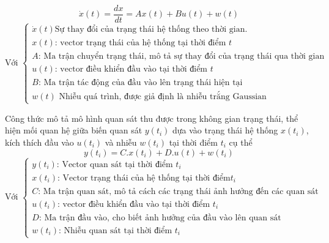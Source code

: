 \documentclass{article}
\begin{document}
    $$\dot{x}(t) = \frac{dx}{dt} = Ax(t) + Bu(t) + w(t)$$
    $$\text{Với }\begin{cases}
        \dot{x}(t) \text{Sự thay đổi của trạng thái hệ thống theo thời gian.}&\\
        x(t) \text{: vector trạng thái của hệ thống tại thời điểm }t&\\
        A \text{: Ma trận chuyển trạng thái, mô tả sự thay đổi của trạng thái qua thời gian}&\\
        u(t) \text{: vector điều khiển đầu vào tại thời điểm }t&\\
        B \text{: Ma trận tác động của đầu vào lên trạng thái hiện tại}&\\
        w(t) \text{ Nhiễu quá trình, được giả định là nhiễu trắng Gaussian}
    \end{cases}$$
    
Công thức mô tả mô hình quan sát thu được trong không gian trạng thái, thể hiện mối quan hệ giữa biến quan sát $y(t_i)$ dựa vào trạng thái hệ thống $x(t_i)$, kích thích đầu vào $u(t_i)$ và nhiễu $w(t_i)$ tại thời điểm $t_i$ cụ thể
$$y(t_i) = C.x(t_i) + D.u(t) + w(t_i)$$
$$\text{Với } \begin{cases}
    y(t_i) \text{: Vector quan sát tại thời điểm }t_i&\\
    x(t_i) \text{: Vector trạng thái của hệ thống tại thời điểm} t_i&\\
    C \text{: Ma trận quan sát, mô tả cách các trạng thái ảnh hưởng đến các quan sát}&\\
    u(t_i) \text{: vector điều khiển đầu vào tại thời điểm }t_i&\\
    D \text{: Ma trận đầu vào, cho biết ảnh hưởng của đầu vào lên quan sát}&\\
    w(t_i) \text{: Nhiễu quan sát tại thời điểm } t_i
\end{cases}$$

    
\end{document}
